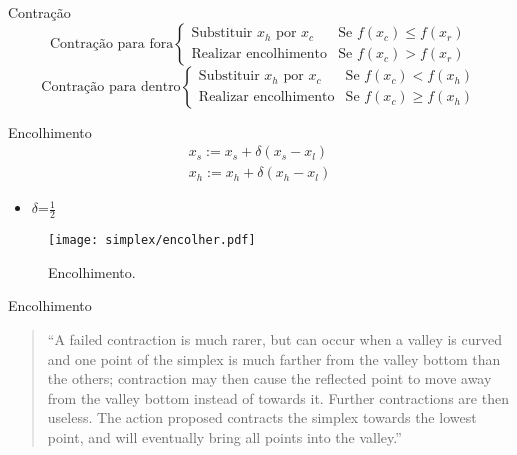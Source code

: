 \begin{frame}[t]{Contração}
\[
\text{Contração para fora}
  \begin{cases} 
    \text{Substituir $x_h$ por $x_c$} & \text{Se } f(x_c)\leq f(x_r) \\
   \text{Realizar encolhimento}       & \text{Se } f(x_c)>f(x_r)
  \end{cases}\]
  \[
  \text{Contração para dentro}
  \begin{cases} 
   \text{Substituir $x_h$ por $x_c$} & \text{Se } f(x_c)<f(x_h) \\
   \text{Realizar encolhimento}       & \text{Se } f(x_c)\geq f(x_h)
  \end{cases}
\]
\end{frame}


\begin{frame}[t]{Encolhimento}
\begin{subequations}
\begin{align}
x_s:=x_s+\delta (x_s-x_l)\\
x_h:=x_h+\delta (x_h-x_l)
\end{align}
\end{subequations}
\begin{itemize}
\item $\delta$=$\frac{1}{2}$
\end{itemize}
\begin{figure}[h]
	\begin{center}	
		\texttt{[image: simplex/encolher.pdf]}
		\caption{Encolhimento.}
		\label{fig:encolher}
	\end{center}
\end{figure}
\end{frame}

\begin{frame}[t]{Encolhimento}
\begin{quote}
``A failed contraction is much rarer, but can occur when a valley is curved and one point of the simplex is much farther from the valley bottom than the others; contraction may then cause the reflected point to move away from the valley bottom instead of towards it. Further contractions are then useless. The action proposed contracts the simplex towards the lowest point, and will eventually bring all points into the valley.''
\end{quote}
\end{frame}

